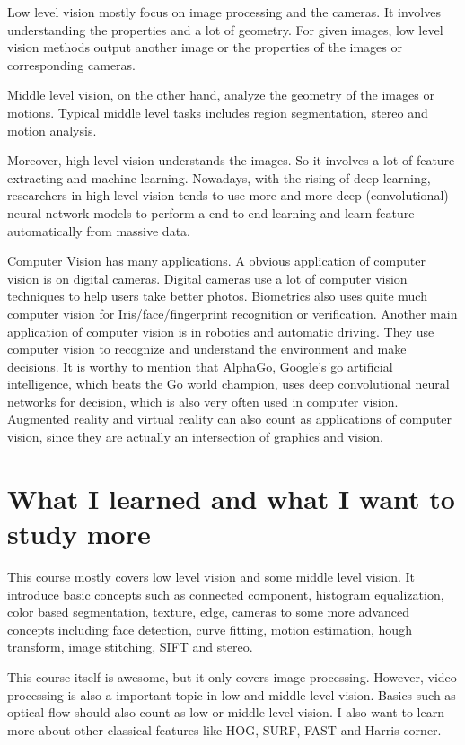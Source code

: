 \documentclass[paper=a4, fontsize=11pt]{scrartcl} %
\numberwithin{equation}{section} %
\numberwithin{figure}{section} %
\numberwithin{table}{section} %
\begin{document}
Low level vision mostly focus on image processing and the cameras. It involves understanding the properties and a lot of geometry. For given images, low level vision methods output another image or the properties of the images or corresponding cameras. 

Middle level vision, on the other hand, analyze the geometry of the images or motions. Typical middle level tasks includes region segmentation, stereo and motion analysis. 

Moreover, high level vision understands the images. So it involves a lot of feature extracting and machine learning. Nowadays, with the rising of deep learning, researchers in high level vision tends to use more and more deep (convolutional) neural network models to perform a end-to-end learning and learn feature automatically from massive data.

Computer Vision has many applications. A obvious application of computer vision is on digital cameras. Digital cameras use a lot of computer vision techniques to help users take better photos. Biometrics also uses quite much computer vision for Iris/face/fingerprint recognition or verification. Another main application of computer vision is in robotics and automatic driving. They use computer vision to recognize and understand the environment and make decisions. It is worthy to mention that AlphaGo, Google's go artificial intelligence, which beats the Go world champion, uses deep convolutional neural networks for decision, which is also very often used in computer vision.  Augmented reality and virtual reality can also count as applications of computer vision, since they are actually an intersection of graphics and vision.

\section*{What I learned and what I want to study more}
This course mostly covers low level vision and some middle level vision. It introduce basic concepts such as connected component, histogram equalization, color based segmentation, texture, edge, cameras to some more advanced concepts including face detection, curve fitting, motion estimation, hough transform, image stitching, SIFT and stereo.

This course itself is awesome, but it only covers image processing. However, video processing is also a important topic in low and middle level vision. Basics such as optical flow should also count as low or middle level vision. I also want to learn more about other classical features like HOG, SURF, FAST and Harris corner.
\end{document}

